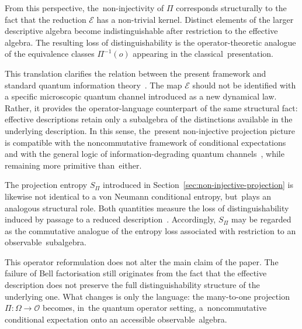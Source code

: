 \documentclass[quantumrep,article,accept,pdftex,oneauthor]{Definitions/mdpi}
\theoremstyle{remark}
\begin{document}
    From this perspective, the~non-injectivity of $\Pi$ corresponds structurally to the fact
    that the reduction $\mathcal{E}$ has a non-trivial kernel.
    Distinct elements of the larger descriptive algebra become indistinguishable after
    restriction to the effective algebra.
    The resulting loss of distinguishability is the operator-theoretic analogue of the
    equivalence classes $\Pi^{-1}(o)$ appearing in the classical~presentation.

    This translation clarifies the relation between the present framework and standard
    quantum information theory~\cite{NielsenChuang2000}.
    The map $\mathcal{E}$ should not be identified with a specific microscopic quantum
    channel introduced as a new dynamical law.
    Rather, it provides the operator-language counterpart of the same structural fact:
    effective descriptions retain only a subalgebra of the distinctions available in the
    underlying description.
    In this sense, the~present non-injective projection picture is compatible with the
    noncommutative framework of conditional expectations and with the general logic of
    information-degrading quantum channels~\cite{Brunner2014}, while remaining more
    primitive than~either.

    The projection entropy $S_\Pi$ introduced in Section~\ref{sec:non-injective-projection} is likewise not identical to a
    von Neumann conditional entropy, but~plays an analogous structural role.
    Both quantities measure the loss of distinguishability induced by passage to a reduced
    description~\cite{NielsenChuang2000}.
    Accordingly, $S_\Pi$ may be regarded as the commutative analogue of the entropy loss
    associated with restriction to an observable~subalgebra.

    This operator reformulation does not alter the main claim of the paper.
    The failure of Bell factorisation still originates from the fact that the effective
    description does not preserve the full distinguishability structure of the underlying one.
    What changes is only the language: the many-to-one projection $\Pi : \Omega \to \mathcal{O}$
    becomes, in~the quantum operator setting, a~noncommutative conditional expectation onto
    an accessible observable~algebra.
\end{document}

